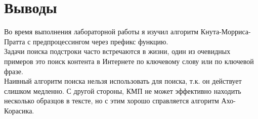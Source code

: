 \section{Выводы}

Во время выполнения лабораторной работы я изучил алгоритм Кнута-Морриса-Пратта с предпроцессингом через префикс функцию.
\\Задачи поиска подстроки часто встречаются в жизни, один из очевидных примеров это поиск контента в Интернете по ключевому слову или по ключевой фразе.
\\Наивный алгоритм поиска нельзя использовать для поиска, т.к. он действует слишком медленно. С другой стороны, КМП не может эффективно находить несколько образцов в тексте, но с этим
хорошо справляется алгоритм Ахо-Корасика.
\pagebreak
